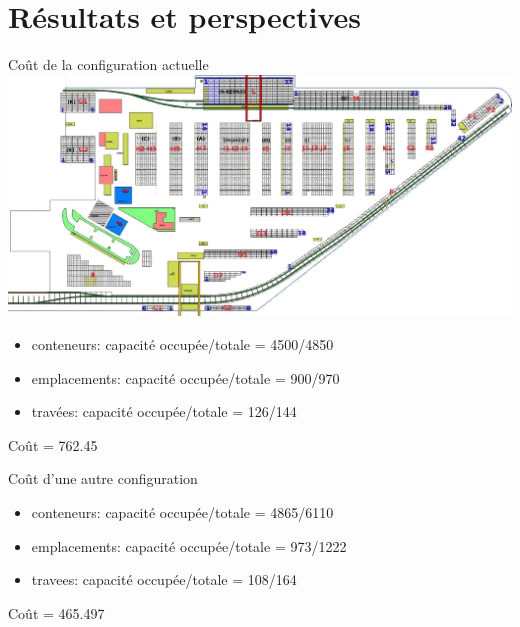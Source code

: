 \section{Résultats et perspectives}

\begin{frame}{Coût de la configuration actuelle}
  \includegraphics[width=\textwidth]{../images/Plan_Terminal.png}
  \vfill
  \begin{itemize}
  \item conteneurs: capacité occupée/totale = 4500/4850
  \item emplacements: capacité occupée/totale = 900/970
  \item travées: capacité occupée/totale = 126/144
  \end{itemize}
  \vfill
  \begin{center}
    Coût = 762.45
  \end{center}
\end{frame}

\begin{frame}{Coût d'une autre configuration}
  
  \vfill
  \begin{itemize}
  \item conteneurs: capacité occupée/totale = 4865/6110
  \item emplacements: capacité occupée/totale = 973/1222
  \item travees: capacité occupée/totale = 108/164
  \end{itemize}
  \vfill
  \begin{center}
    {\color{green!50!black}Coût = 465.497}
  \end{center}
\end{frame}

